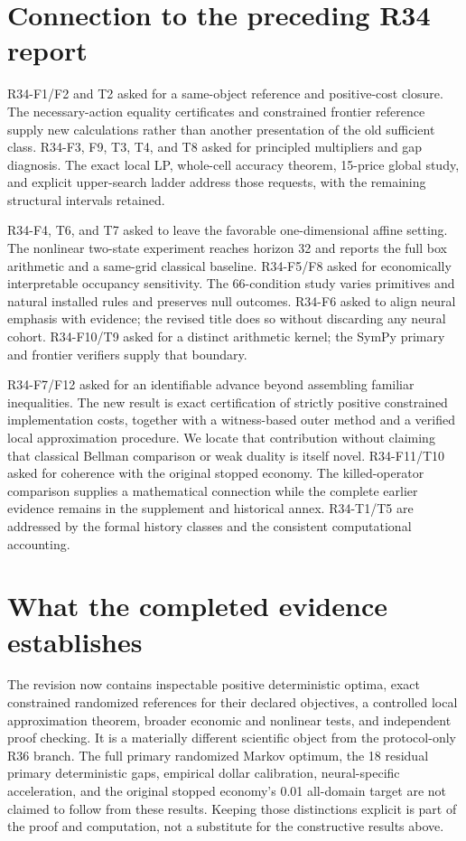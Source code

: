 \section{Connection to the preceding R34 report}
R34-F1/F2 and T2 asked for a same-object reference and positive-cost closure. The necessary-action equality certificates and constrained frontier reference supply new calculations rather than another presentation of the old sufficient class. R34-F3, F9, T3, T4, and T8 asked for principled multipliers and gap diagnosis. The exact local LP, whole-cell accuracy theorem, 15-price global study, and explicit upper-search ladder address those requests, with the remaining structural intervals retained.

R34-F4, T6, and T7 asked to leave the favorable one-dimensional affine setting. The nonlinear two-state experiment reaches horizon 32 and reports the full box arithmetic and a same-grid classical baseline. R34-F5/F8 asked for economically interpretable occupancy sensitivity. The 66-condition study varies primitives and natural installed rules and preserves null outcomes. R34-F6 asked to align neural emphasis with evidence; the revised title does so without discarding any neural cohort. R34-F10/T9 asked for a distinct arithmetic kernel; the SymPy primary and frontier verifiers supply that boundary.

R34-F7/F12 asked for an identifiable advance beyond assembling familiar inequalities. The new result is exact certification of strictly positive constrained implementation costs, together with a witness-based outer method and a verified local approximation procedure. We locate that contribution without claiming that classical Bellman comparison or weak duality is itself novel. R34-F11/T10 asked for coherence with the original stopped economy. The killed-operator comparison supplies a mathematical connection while the complete earlier evidence remains in the supplement and historical annex. R34-T1/T5 are addressed by the formal history classes and the consistent computational accounting.

\section{What the completed evidence establishes}
The revision now contains inspectable positive deterministic optima, exact constrained randomized references for their declared objectives, a controlled local approximation theorem, broader economic and nonlinear tests, and independent proof checking. It is a materially different scientific object from the protocol-only R36 branch. The full primary randomized Markov optimum, the 18 residual primary deterministic gaps, empirical dollar calibration, neural-specific acceleration, and the original stopped economy's 0.01 all-domain target are not claimed to follow from these results. Keeping those distinctions explicit is part of the proof and computation, not a substitute for the constructive results above.

